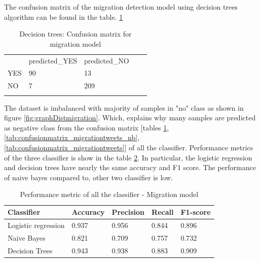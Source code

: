 \begin{itemize}
    The confusion matrix of the migration detection model using decision trees algorithm can be found in the table.
 \ref{tab:confusionmatrix_migrationtweets_DT} 

\begin{table}[]
\centering
\begin{tabular}{lllll}
\cline{1-3}
\multicolumn{1}{|l|}{}   & \multicolumn{1}{l|}{predicted\_YES} & \multicolumn{1}{l|}{predicted\_NO}  &  &  \\ \cline{1-3}
\multicolumn{1}{|l|}{YES} & \multicolumn{1}{l|}{90}  & \multicolumn{1}{l|}{13} &  &  \\ \cline{1-3}
\multicolumn{1}{|l|}{NO}   & \multicolumn{1}{l|}{7}  & \multicolumn{1}{l|}{209}  &  &  \\ \cline{1-3}
                            &                           &                           &  & 
\end{tabular}
\caption{Decision trees: Confusion matrix for migration model}
\label{tab:confusionmatrix_migrationtweets_DT}
\end{table}
\end{itemize}

 The dataset is imbalanced with majority of samples in "no" class as shown in figure \ref{fig:graphDistmigration}. Which, explains why many samples are predicted as negative class from the confusion matrix [tables \ref{tab:confusionmatrix_migrationtweets_DT}, \ref{tab:confusionmatrix_migrationtweets_nb}, \ref{tab:confusionmatrix_migrationtweets}]  of all the classifier. Performance metrics of the three classifier is show in the table \ref{tab:Migration_metric}. In particular, the logistic regression and decision trees have nearly the same accuracy and F1 score. The performance of naive bayes compared to, other two classifier is low.

\begin{table}[]
\centering
\begin{tabular}{lllll}
\hline
\textbf{Classifier} & \textbf{Accuracy} & \textbf{Precision} & \textbf{Recall} & \textbf{F1-score} \\ \hline
Logistic regression & 0.937             & 0.956              & 0.844           & 0.896             \\ \hline
Naive Bayes         & 0.821             & 0.709              & 0.757           & 0.732             \\ \hline
Decision Trees     & 0.943             & 0.938              & 0.883           & 0.909             \\ \hline
\end{tabular}
\caption{Performance metric of all the classifier - Migration model}
\label{tab:Migration_metric}
\end{table}


